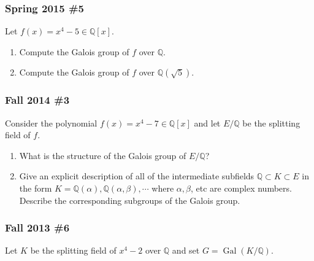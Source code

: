 \hypertarget{spring-2015-5}{%
\subsubsection{Spring 2015 \#5}\label{spring-2015-5}}

Let \(f(x) = x^4 - 5 \in {\mathbb{Q}}[x]\).

\begin{enumerate}
\def\labelenumi{\alph{enumi}.}
\item
  Compute the Galois group of \(f\) over \({\mathbb{Q}}\).
\item
  Compute the Galois group of \(f\) over \({\mathbb{Q}}(\sqrt{5})\).
\end{enumerate}

\hypertarget{fall-2014-3}{%
\subsubsection{Fall 2014 \#3}\label{fall-2014-3}}

Consider the polynomial \(f(x) = x^4 - 7 \in {\mathbb{Q}}[x]\) and let
\(E/{\mathbb{Q}}\) be the splitting field of \(f\).

\begin{enumerate}
\def\labelenumi{\alph{enumi}.}
\item
  What is the structure of the Galois group of \(E/{\mathbb{Q}}\)?
\item
  Give an explicit description of all of the intermediate subfields
  \({\mathbb{Q}}\subset K \subset E\) in the form
  \(K = {\mathbb{Q}}(\alpha), {\mathbb{Q}}(\alpha, \beta), \cdots\)
  where \(\alpha, \beta\), etc are complex numbers. Describe the
  corresponding subgroups of the Galois group.
\end{enumerate}

\hypertarget{fall-2013-6}{%
\subsubsection{Fall 2013 \#6}\label{fall-2013-6}}

Let \(K\) be the splitting field of \(x^4-2\) over \({\mathbb{Q}}\) and
set \(G = { \operatorname{Gal}} (K/{\mathbb{Q}})\).

